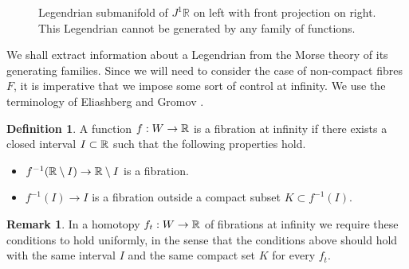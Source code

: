 \documentclass[11pt]{article}
\newcommand{\smaller}{\small}
\numberwithin{equation}{section}\providecommand{\dpl}{\displaystyle}
\theoremstyle{plain}
\theoremstyle{definition}
\newtheorem{definition}[theorem]{Definition}
\newtheorem{remark}[theorem]{Remark}
\begin{document}
\begin{figure}[htbp]
\begin{center}
\caption{\smaller Legendrian submanifold of $J^1\mathbb R$ on left with front projection on right. This Legendrian cannot be generated by any family of functions.}
\label{FigLegendrian}
\end{center}
\end{figure}

We shall extract information about a Legendrian from the Morse theory of its generating families. Since we will need to consider the case of non-compact fibres $F$, it is imperative that we impose some sort of control at infinity. We use the terminology of Eliashberg and Gromov \cite{EG98}.

\begin{definition}\label{Definition: fibration at infinity}
A function $f:W \to \mathbb{R}$ is a fibration at infinity if there exists a closed interval $I \subset \mathbb{R}$ such that the following properties hold.
\begin{itemize}
\item $f^{-1}(\mathbb{R} \setminus I) \to \mathbb{R} \setminus I$ is a fibration.
\item $f^{-1}(I)\to I$ is a fibration outside a compact subset $K \subset f^{-1}(I)$.
\end{itemize}
\end{definition}

\begin{remark}\label{Remark: infinity family}
In a homotopy $f_t: W \to \mathbb{R}$ of fibrations at infinity we require these conditions to hold uniformly, in the sense that the conditions above should hold with the same interval $I$ and the same compact set $K$ for every $f_t$.
\end{remark}
\end{document}

